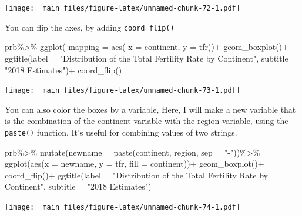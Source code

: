 \documentclass[
]{book}
\newenvironment{Shaded}{\begin{snugshade}}{\end{snugshade}}
\newcommand{\AttributeTok}[1]{\textcolor[rgb]{0.77,0.63,0.00}{#1}}
\newcommand{\FunctionTok}[1]{\textcolor[rgb]{0.00,0.00,0.00}{#1}}
\newcommand{\NormalTok}[1]{#1}
\newcommand{\SpecialCharTok}[1]{\textcolor[rgb]{0.00,0.00,0.00}{#1}}
\newcommand{\StringTok}[1]{\textcolor[rgb]{0.31,0.60,0.02}{#1}}
\begin{document}
\texttt{[image: \_main\_files/figure-latex/unnamed-chunk-72-1.pdf]}

You can flip the axes, by adding \texttt{coord\_flip()}

\begin{Shaded}
\begin{Highlighting}[]
\NormalTok{prb}\SpecialCharTok{\%\textgreater{}\%}
\FunctionTok{ggplot}\NormalTok{( }\AttributeTok{mapping =} \FunctionTok{aes}\NormalTok{( }\AttributeTok{x =}\NormalTok{ continent,}
                       \AttributeTok{y =}\NormalTok{ tfr))}\SpecialCharTok{+}
  \FunctionTok{geom\_boxplot}\NormalTok{()}\SpecialCharTok{+}
  \FunctionTok{ggtitle}\NormalTok{(}\AttributeTok{label =} \StringTok{"Distribution of the Total Fertility Rate by Continent"}\NormalTok{,}
          \AttributeTok{subtitle =} \StringTok{"2018 Estimates"}\NormalTok{)}\SpecialCharTok{+}
  \FunctionTok{coord\_flip}\NormalTok{()}
\end{Highlighting}
\end{Shaded}

\texttt{[image: \_main\_files/figure-latex/unnamed-chunk-73-1.pdf]}

You can also color the boxes by a variable, Here, I will make a new
variable that is the combination of the continent variable with the
region variable, using the \texttt{paste()} function. It's useful for combining
values of two strings.

\begin{Shaded}
\begin{Highlighting}[]
\NormalTok{prb}\SpecialCharTok{\%\textgreater{}\%}
  \FunctionTok{mutate}\NormalTok{(}\AttributeTok{newname =} \FunctionTok{paste}\NormalTok{(continent, region, }\AttributeTok{sep =} \StringTok{"{-}"}\NormalTok{))}\SpecialCharTok{\%\textgreater{}\%}
  \FunctionTok{ggplot}\NormalTok{(}\FunctionTok{aes}\NormalTok{(}\AttributeTok{x =}\NormalTok{ newname,}
             \AttributeTok{y =}\NormalTok{ tfr,}
             \AttributeTok{fill =}\NormalTok{ continent))}\SpecialCharTok{+}
  \FunctionTok{geom\_boxplot}\NormalTok{()}\SpecialCharTok{+}
  \FunctionTok{coord\_flip}\NormalTok{()}\SpecialCharTok{+}
  \FunctionTok{ggtitle}\NormalTok{(}\AttributeTok{label =} \StringTok{"Distribution of the Total Fertility Rate by Continent"}\NormalTok{,}
          \AttributeTok{subtitle =} \StringTok{"2018 Estimates"}\NormalTok{)}
\end{Highlighting}
\end{Shaded}

\texttt{[image: \_main\_files/figure-latex/unnamed-chunk-74-1.pdf]}
\end{document}

